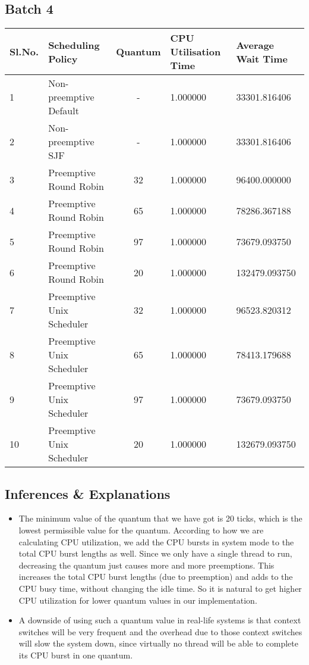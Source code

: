 \documentclass{article}
\begin{document}
\subsection{Batch 4}
\begin{center}
    \begin{tabular}{| l | l | c | l | l |}
    \hline
    Sl.No. & Scheduling Policy & Quantum & CPU Utilisation Time & Average Wait Time \\ \hline
    1 & Non-preemptive Default & - & 1.000000 & 33301.816406 \\
    2 & Non-preemptive SJF & - & 1.000000 & 33301.816406 \\
    3 & Preemptive Round Robin & 32 & 1.000000 & 96400.000000 \\
    4 & Preemptive Round Robin & 65 & 1.000000 & 78286.367188 \\
    5 & Preemptive Round Robin & 97 & 1.000000 & 73679.093750 \\
    6 & Preemptive Round Robin & 20 & 1.000000 & 132479.093750 \\
    7 & Preemptive Unix Scheduler & 32 & 1.000000 & 96523.820312 \\
    8 & Preemptive Unix Scheduler & 65 & 1.000000 & 78413.179688 \\
    9 & Preemptive Unix Scheduler & 97 & 1.000000 & 73679.093750 \\
    10 & Preemptive Unix Scheduler & 20 & 1.000000 & 132679.093750 \\
    \hline
    \end{tabular}
\end{center}
\subsection{Inferences \& Explanations}
\begin{itemize}
\item The minimum value of the quantum that we have got is 20 ticks, which is the lowest permissible value for the quantum. According to how we are calculating CPU utilization, we add the CPU bursts in system mode to the total CPU burst lengths as well. Since we only have a single thread to run, decreasing the quantum just causes more and more preemptions. This increases the total CPU burst lengths (due to preemption) and adds to the CPU busy time, without changing the idle time. So it is natural to get higher CPU utilization for lower quantum values in our implementation.
\item A downside of using such a quantum value in real-life systems is that context switches will be very frequent and the overhead due to those context switches will slow the system down, since virtually no thread will be able to complete its CPU burst in one quantum.
\end{itemize}
\end{document}
